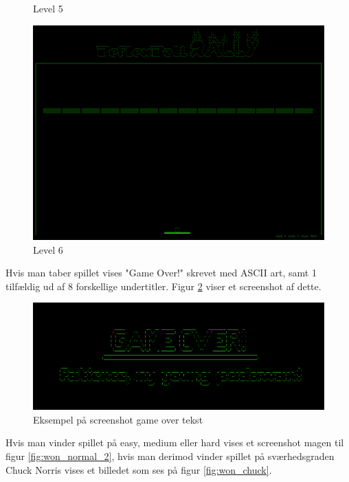 \begin{figure}[h!]
\begin{minipage}[b]{0.32\textwidth}
\caption{Level 5}
\label{fig:level5}
\end{minipage}\hfill
\begin{minipage}[b]{0.32\textwidth}
\includegraphics[width=\linewidth]{figs/screenshots/level6.png}
\caption{Level 6}
\label{fig:level6}
\end{minipage}\hfill
\end{figure}

Hvis man taber spillet vises "Game Over!" skrevet med ASCII art, samt 1 tilfældig ud af 8 forskellige undertitler. Figur \ref{fig:gameover_2} viser et screenshot af dette. \\

\begin{figure}[h!]
\centering
\includegraphics[scale=0.25]{figs/screenshots/gameover_crop.png}
\caption{Eksempel på screenshot game over tekst}
\label{fig:gameover_2}
\end{figure}

Hvis man vinder spillet på easy, medium eller hard vises et screenshot magen til figur \ref{fig:won_normal_2}, hvis man derimod vinder spillet på sværhedsgraden Chuck Norris vises et billedet som ses på figur \ref{fig:won_chuck}.

